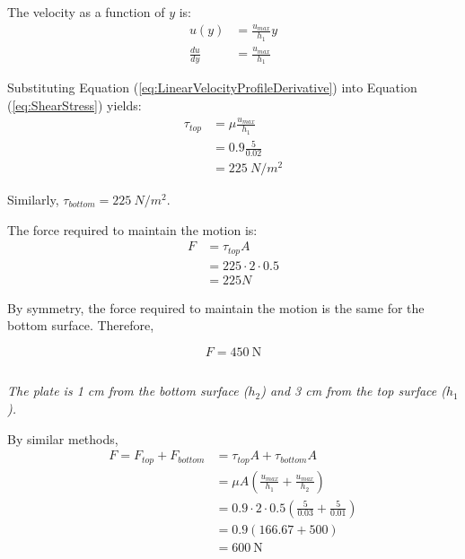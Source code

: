 The velocity as a function of $y$ is:
\begin{align}
    u(y) &= \frac{u_{max}}{h_1}y \label{eq:LinearVelocityProfile} \\
    \frac{du}{dy} &= \frac{u_{max}}{h_1} \label{eq:LinearVelocityProfileDerivative}
\end{align}

Substituting Equation (\ref{eq:LinearVelocityProfileDerivative}) into Equation
(\ref{eq:ShearStress}) yields:
\begin{align}
    \tau_{top} &= \mu \frac{u_{max}}{h_1} \nonumber \\
        &= 0.9 \frac{5}{0.02} \nonumber \\
        &= \qty{225}{N/m^2} \nonumber
\end{align}

Similarly, $\tau_{bottom} = \qty{225}{N/m^2}$.

The force required to maintain the motion is:
\begin{align}
    F &= \tau_{top} A \nonumber \\
        &= 225 \cdot 2 \cdot 0.5 \nonumber \\
        &= 225 \unit{N} \nonumber
\end{align}

By symmetry, the force required to maintain the motion is the same for the
bottom surface. Therefore,

\begin{equation*}
    \boxed{F = \qty{450}{\newton}}
\end{equation*}

\subsection{}
\textit{The plate is 1 cm from the bottom surface ($h_2$) and 3 cm from the top surface ($h_1$).}

By similar methods,
\begin{align*}
    F = F_{top} + F_{bottom} &= \tau_{top} A + \tau_{bottom} A \\
        &= \mu A \left(\frac{u_{max}}{h_1} + \frac{u_{max}}{h_2}\right) \\
        &= 0.9 \cdot 2 \cdot 0.5 \left(\frac{5}{0.03} + \frac{5}{0.01}\right) \\
        &= 0.9(166.67 + 500) \\
        &= \boxed{\qty{600}{\newton}}
\end{align*}